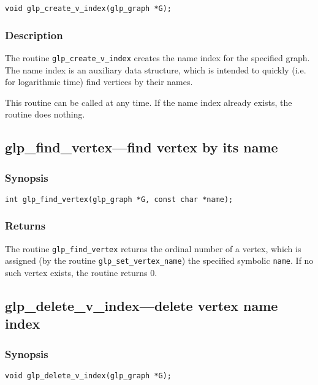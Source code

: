 \documentclass[dvipdfm,11pt]{report}
\begin{document}
\begin{verbatim}
void glp_create_v_index(glp_graph *G);
\end{verbatim}

\subsubsection*{Description}

The routine \verb|glp_create_v_index| creates the name index for the
specified graph. The name index is an auxiliary data structure, which
is intended to quickly (i.e. for logarithmic time) find vertices by
their names.

This routine can be called at any time. If the name index already
exists, the routine does nothing.

\subsection{glp\_find\_vertex---find vertex by its name}

\subsubsection*{Synopsis}

\begin{verbatim}
int glp_find_vertex(glp_graph *G, const char *name);
\end{verbatim}

\subsubsection*{Returns}

The routine \verb|glp_find_vertex| returns the ordinal number of
a vertex, which is assigned (by the routine \verb|glp_set_vertex_name|)
the specified symbolic \verb|name|. If no such vertex exists, the
routine returns 0.

\subsection{glp\_delete\_v\_index---delete vertex name index}

\subsubsection*{Synopsis}

\begin{verbatim}
void glp_delete_v_index(glp_graph *G);
\end{verbatim}
\end{document}
